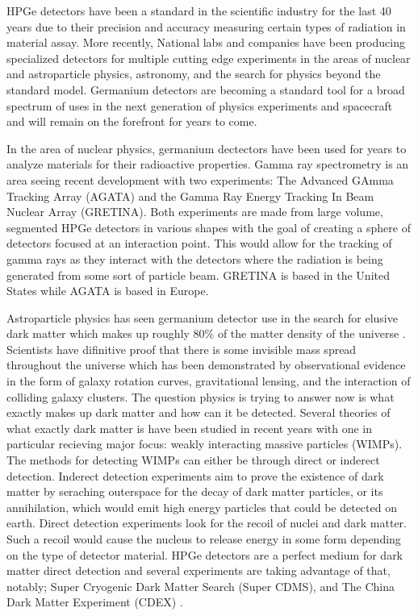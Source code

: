 HPGe detectors have been a standard in the scientific industry for the last 40 years due to their precision and accuracy measuring certain types of radiation in material assay.
More recently, National labs and companies have been producing specialized detectors for multiple cutting edge experiments in the areas of nuclear and astroparticle physics, astronomy, and the search for physics beyond the standard model.
Germanium detectors are becoming a standard tool for a broad spectrum of uses in the next generation of physics experiments and spacecraft and will remain on the forefront for years to come.

In the area of nuclear physics, germanium dectectors have been used for years to analyze materials for their radioactive properties.
Gamma ray spectrometry is an area seeing recent development with two experiments: The Advanced GAmma Tracking Array (AGATA)\cite{agata} and the Gamma Ray Energy Tracking In Beam Nuclear Array (GRETINA)\cite{gretina}.
Both experiments are made from large volume, segmented HPGe detectors in various shapes with the goal of creating a sphere of detectors focused at an interaction point.
This would allow for the tracking of gamma rays as they interact with the detectors where the radiation is being generated from some sort of particle beam.
GRETINA is based in the United States while AGATA is based in Europe.

Astroparticle physics has seen germanium detector use in the search for elusive dark matter which makes up roughly 80\% of the matter density of the universe \cite{cdms}.
Scientists have difinitive proof that there is some invisible mass spread throughout the universe which has been demonstrated by observational evidence in the form of galaxy rotation curves, gravitational lensing, and the interaction of colliding galaxy clusters.
The question physics is trying to answer now is what exactly makes up dark matter and how can it be detected.
Several theories of what exactly dark matter is have been studied in recent years with one in particular recieving major focus: weakly interacting massive particles (WIMPs).
The methods for detecting WIMPs can either be through direct or inderect detection.
Inderect detection experiments aim to prove the existence of dark matter by seraching outerspace for the decay of dark matter particles, or its annihilation, which would emit high energy particles that could be detected on earth.
Direct detection experiments look for the recoil of nuclei and dark matter.
Such a recoil would cause the nucleus to release energy in some form depending on the type of detector material.
HPGe detectors are a perfect medium for dark matter direct detection and several experiments are taking advantage of that, notably; Super Cryogenic Dark Matter Search (Super CDMS)\cite{cdms}, and The China Dark Matter Experiment (CDEX) \cite{cdex}.

